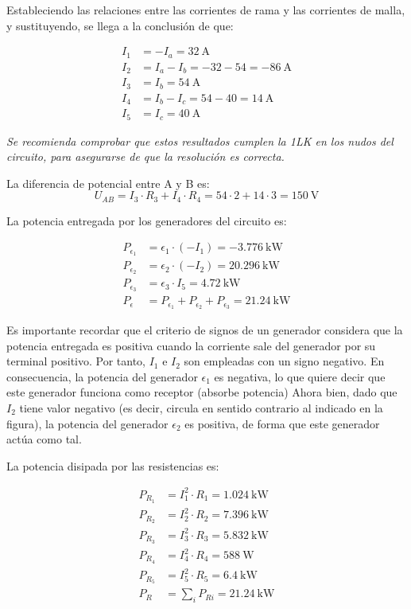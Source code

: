 Estableciendo las relaciones entre las corrientes de rama y las
corrientes de malla, y sustituyendo, se llega a la conclusión de que:

\begin{align*}
  I_1 &= -I_a=\qty{32}{\ampere}\\
  I_2 &= I_a - I_b=-32-54=\qty{-86}{\ampere}\\
  I_3 &= I_b=\qty{54}{\ampere}\\
  I_4 &= I_b - I_c=54-40=\qty{14}{\ampere}\\
  I_5 &= I_c=\qty{40}{\ampere}
\end{align*}

\emph{Se recomienda comprobar que estos resultados cumplen la 1LK en
  los nudos del circuito, para asegurarse de que la resolución es
  correcta.}

La diferencia de potencial entre A y B es:
\begin{equation*}
  U_{AB} = I_3 \cdot R_3 + I_4 \cdot R_4 = 54\cdot 2+14\cdot 3= \qty{150}{\volt}
\end{equation*}

La potencia entregada por los generadores del circuito es:

\begin{align*}
  P_{\epsilon_1} &= \epsilon_1 \cdot (-I_1) = -\qty{3,776}{\kilo\watt}\\
  P_{\epsilon_2} &= \epsilon_2 \cdot (-I_2) = \qty{20,296}{\kilo\watt}\\
  P_{\epsilon_3} &= \epsilon_3 \cdot I_5 = \qty{4,72}{\kilo\watt}\\
  P_\epsilon &= P_{\epsilon_1} + P_{\epsilon_2} + P_{\epsilon_3} = \qty{21,24}{\kilo\watt}  
\end{align*}

Es importante recordar que el criterio de signos de un generador considera que la potencia entregada es positiva cuando la corriente sale del generador por su terminal positivo. Por tanto, $I_1$ e $I_2$ son empleadas con un signo negativo. En consecuencia, la potencia del generador $\epsilon_1$ es negativa, lo que quiere decir que este generador funciona como receptor (absorbe potencia) Ahora bien, dado que $I_2$ tiene valor negativo (es decir, circula en sentido contrario al indicado en la figura), la potencia del generador $\epsilon_2$ es positiva, de forma que este generador actúa como tal.

La potencia disipada por las resistencias es:

\begin{align*}
  P_{R_1} &= I_1^2 \cdot R_1 = \qty{1,024}{\kilo\watt}\\
  P_{R_2} &= I_2^2 \cdot R_2 = \qty{7,396}{\kilo\watt}\\
  P_{R_3} &= I_3^2 \cdot R_3 = \qty{5,832}{\kilo\watt}\\
  P_{R_4} &= I_4^2 \cdot R_4 = \qty{588}{\watt}\\
  P_{R_5} &= I_5^2 \cdot R_5 = \qty{6,4}{\kilo\watt}\\
  P_R &= \sum_i P_{Ri} = \qty{21,24}{\kilo\watt}  
\end{align*}

